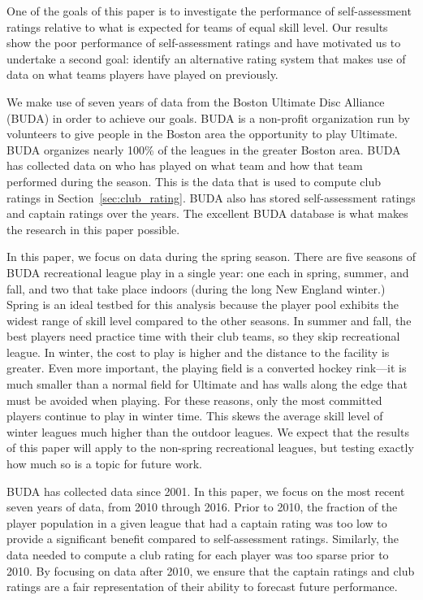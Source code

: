 One of the goals of this paper is to investigate the performance of self-assessment ratings relative to what is expected for teams of equal skill level.  Our results show the poor performance of self-assessment ratings and have motivated us to undertake a second goal: identify an alternative rating system that makes use of data on what teams players have played on previously. 

We make use of seven years of data from the Boston Ultimate Disc Alliance (BUDA) in order to achieve our goals. BUDA is a non-profit organization run by volunteers to give people in the Boston area the opportunity to play Ultimate. BUDA organizes nearly 100\% of the leagues in the greater Boston area. BUDA has collected data on who has played on what team and how that team performed during the season.  This is the data that is used to compute club ratings in Section~\ref{sec:club_rating}.  BUDA also has stored self-assessment ratings and captain ratings over the years.  The excellent BUDA database is what makes the research in this paper possible.  

In this paper, we focus on data during the spring season.  There are five seasons of BUDA recreational league play in a single year: one each in spring, summer, and fall, and two that take place indoors (during the long New England winter.) Spring is an ideal testbed for this analysis because the player pool exhibits the widest range of skill level compared to the other seasons.  In summer and fall, the best players need practice time with their club teams, so they skip recreational league.  In winter, the cost to play is higher and the distance to the facility is greater.  Even more important, the playing field is a converted hockey rink---it is much smaller than a normal field for Ultimate and has walls along the edge that must be avoided when playing.  For these reasons, only the most committed players continue to play in winter time. This skews the average skill level of winter leagues much higher than the outdoor leagues.  We expect that the results of this paper will apply to the non-spring recreational leagues, but testing exactly how much so is a topic for future work.

BUDA has collected data since 2001. In this paper, we focus on the most recent seven years of data, from 2010 through 2016.  Prior to 2010, the fraction of the player population in a given league that had a captain rating was too low to provide a significant benefit compared to self-assessment ratings.  Similarly, the data needed to compute a club rating for each player was too sparse prior to 2010. By focusing on data after 2010, we ensure that the captain ratings and club ratings are a fair representation of their ability to forecast future performance.

